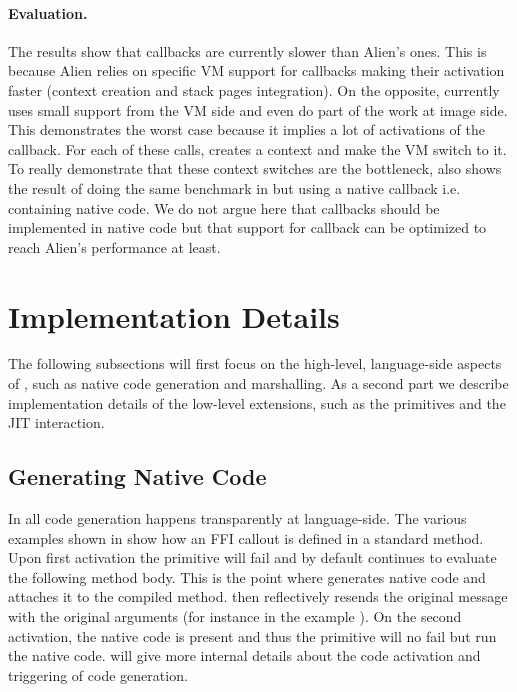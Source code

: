 \paragraph{Evaluation.}
The results show that \NB callbacks are currently slower than Alien's ones.
This is because Alien relies on specific VM support for callbacks making their activation faster (context creation and stack pages integration).
On the opposite, \NB currently uses small support from the VM side and even do part of the work at image side.
This  demonstrates the worst case because it implies a lot of activations of the callback.
For each of these calls, \NB creates a context and make the VM switch to it.
To really demonstrate that these context switches are the bottleneck,  also shows the result of doing the same benchmark in \NB but using a native callback i.e. containing native code.
We do not argue here that callbacks should be implemented in native code but that \NB support for callback can be optimized to reach Alien's performance at least.

\section{\NBFFI Implementation Details}

The following subsections will first focus on the high-level, language-side aspects of \NB, such as native code generation and marshalling.
As a second part we describe implementation details of the low-level extensions, such as the \NB primitives and the JIT interaction.

\subsection{Generating Native Code}

In \NB all code generation happens transparently at language-side.
The various examples shown in  show how an FFI callout is defined in a standard method.
Upon first activation the \NB primitive will fail and by default continues to evaluate the following method body.
This is the point where \NB generates native code and attaches it to the compiled method.
\NB then reflectively resends the original message with the original arguments (for instance  in the example ).
On the second activation, the native code is present and thus the primitive will no fail but run the native code.
 will give more internal details about the code activation and triggering of code generation.

